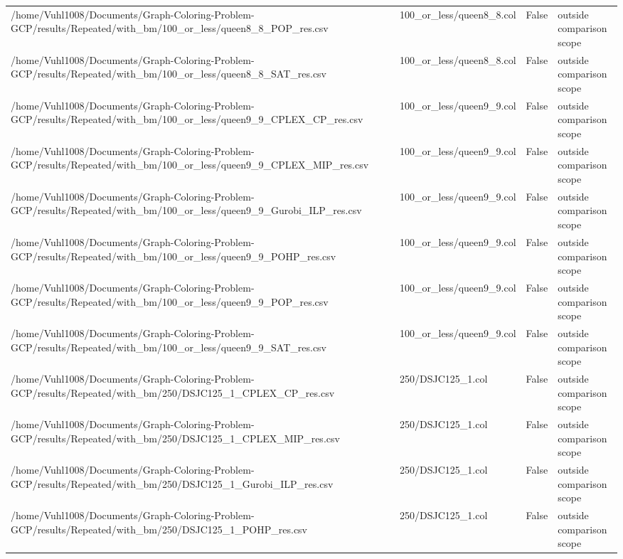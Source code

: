 \begin{table}[htbp]
\begin{tabular}{llll}
/home/Vuhl1008/Documents/Graph-Coloring-Problem-GCP/results/Repeated/with\_bm/100\_or\_less/queen8\_8\_POP\_res.csv & 100\_or\_less/queen8\_8.col & False & outside comparison scope \\
/home/Vuhl1008/Documents/Graph-Coloring-Problem-GCP/results/Repeated/with\_bm/100\_or\_less/queen8\_8\_SAT\_res.csv & 100\_or\_less/queen8\_8.col & False & outside comparison scope \\
/home/Vuhl1008/Documents/Graph-Coloring-Problem-GCP/results/Repeated/with\_bm/100\_or\_less/queen9\_9\_CPLEX\_CP\_res.csv & 100\_or\_less/queen9\_9.col & False & outside comparison scope \\
/home/Vuhl1008/Documents/Graph-Coloring-Problem-GCP/results/Repeated/with\_bm/100\_or\_less/queen9\_9\_CPLEX\_MIP\_res.csv & 100\_or\_less/queen9\_9.col & False & outside comparison scope \\
/home/Vuhl1008/Documents/Graph-Coloring-Problem-GCP/results/Repeated/with\_bm/100\_or\_less/queen9\_9\_Gurobi\_ILP\_res.csv & 100\_or\_less/queen9\_9.col & False & outside comparison scope \\
/home/Vuhl1008/Documents/Graph-Coloring-Problem-GCP/results/Repeated/with\_bm/100\_or\_less/queen9\_9\_POHP\_res.csv & 100\_or\_less/queen9\_9.col & False & outside comparison scope \\
/home/Vuhl1008/Documents/Graph-Coloring-Problem-GCP/results/Repeated/with\_bm/100\_or\_less/queen9\_9\_POP\_res.csv & 100\_or\_less/queen9\_9.col & False & outside comparison scope \\
/home/Vuhl1008/Documents/Graph-Coloring-Problem-GCP/results/Repeated/with\_bm/100\_or\_less/queen9\_9\_SAT\_res.csv & 100\_or\_less/queen9\_9.col & False & outside comparison scope \\
/home/Vuhl1008/Documents/Graph-Coloring-Problem-GCP/results/Repeated/with\_bm/250/DSJC125\_1\_CPLEX\_CP\_res.csv & 250/DSJC125\_1.col & False & outside comparison scope \\
/home/Vuhl1008/Documents/Graph-Coloring-Problem-GCP/results/Repeated/with\_bm/250/DSJC125\_1\_CPLEX\_MIP\_res.csv & 250/DSJC125\_1.col & False & outside comparison scope \\
/home/Vuhl1008/Documents/Graph-Coloring-Problem-GCP/results/Repeated/with\_bm/250/DSJC125\_1\_Gurobi\_ILP\_res.csv & 250/DSJC125\_1.col & False & outside comparison scope \\
/home/Vuhl1008/Documents/Graph-Coloring-Problem-GCP/results/Repeated/with\_bm/250/DSJC125\_1\_POHP\_res.csv & 250/DSJC125\_1.col & False & outside comparison scope \\

\end{tabular}
\end{table}
